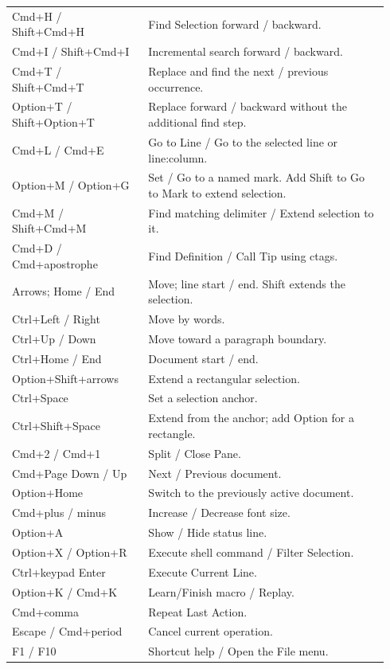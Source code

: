 \documentclass[11pt,letterpaper]{article}
\begin{document}
\begin{longtable}{@{}P{0.34\linewidth}P{0.60\linewidth}@{}}
Cmd+H / Shift+Cmd+H & Find Selection forward / backward.\\
Cmd+I / Shift+Cmd+I & Incremental search forward / backward.\\
Cmd+T / Shift+Cmd+T & Replace and find the next / previous occurrence.\\
Option+T / Shift+Option+T & Replace forward / backward without the additional find step.\\
Cmd+L / Cmd+E & Go to Line / Go to the selected line or line:column.\\
Option+M / Option+G & Set / Go to a named mark. Add Shift to Go to Mark to extend selection.\\
Cmd+M / Shift+Cmd+M & Find matching delimiter / Extend selection to it.\\
Cmd+D / Cmd+apostrophe & Find Definition / Call Tip using ctags.\\
\midrule
Arrows; Home / End & Move; line start / end. Shift extends the selection.\\
Ctrl+Left / Right & Move by words.\\
Ctrl+Up / Down & Move toward a paragraph boundary.\\
Ctrl+Home / End & Document start / end.\\
Option+Shift+arrows & Extend a rectangular selection.\\
Ctrl+Space & Set a selection anchor.\\
Ctrl+Shift+Space & Extend from the anchor; add Option for a rectangle.\\
Cmd+2 / Cmd+1 & Split / Close Pane.\\
Cmd+Page Down / Up & Next / Previous document.\\
Option+Home & Switch to the previously active document.\\
Cmd+plus / minus & Increase / Decrease font size.\\
Option+A & Show / Hide status line.\\
Option+X / Option+R & Execute shell command / Filter Selection.\\
Ctrl+keypad Enter & Execute Current Line.\\
Option+K / Cmd+K & Learn/Finish macro / Replay.\\
Cmd+comma & Repeat Last Action.\\
Escape / Cmd+period & Cancel current operation.\\
F1 / F10 & Shortcut help / Open the File menu.\\
\bottomrule
\end{longtable}
\end{document}
